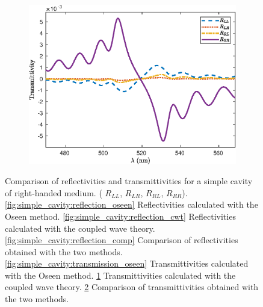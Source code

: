 \begin{figure}
\begin{subfigure}{0.32\linewidth}
		\caption{}
		\label{fig:simple_cavity:transmission_cwt}
	\end{subfigure}
	\begin{subfigure}{0.32\linewidth}
		\includegraphics[width=\linewidth]{plots/simple/transmission_comp}
		\caption{}
		\label{fig:simple_cavity:transmission_comp}
	\end{subfigure}
	\caption[Comparison of reflectivities and transmittivities for a simple cavity]{Comparison of reflectivities and transmittivities for a simple cavity of right-handed medium. (\protect{} $R_{LL}$, \protect{} $R_{LR}$, \protect{} $R_{RL}$, \protect{} $R_{RR}$).
	\ref{fig:simple_cavity:reflection_oseen} Reflectivities calculated with the Oseen method. \ref{fig:simple_cavity:reflection_cwt} Reflectivities calculated with the coupled wave theory. \ref{fig:simple_cavity:reflection_comp} Comparison of reflectivities obtained with the two methods. \ref{fig:simple_cavity:transmission_oseen} Transmittivities calculated with the Oseen method. \ref{fig:simple_cavity:transmission_cwt} Transmittivities calculated with the coupled wave theory. \ref{fig:simple_cavity:transmission_comp} Comparison of transmittivities obtained with the two methods.}
	\label{fig:simple_cavity:reflection}
\end{figure}

